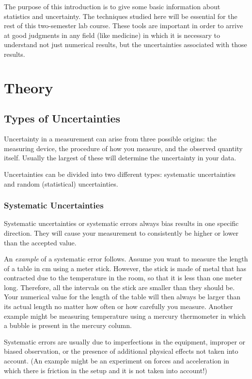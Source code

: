 The purpose of this introduction is to give some basic information about statistics and uncertainty. The techniques studied here will be essential for the rest of this two-semester lab course. These tools are important in order to arrive at good judgments in any field (like medicine) in which it is necessary to understand not just numerical results, but the uncertainties associated with those results.

\section{Theory}

\subsection{Types of Uncertainties}

Uncertainty in a measurement can arise from three possible origins: the measuring device, the procedure of how you measure, and the observed quantity itself. Usually the largest of these will determine the uncertainty in your data. \myskip

Uncertainties can be divided into two different types: systematic uncertainties and random (statistical) uncertainties.

\subsubsection{Systematic Uncertainties}

Systematic uncertainties or systematic errors always bias results in one specific direction. They will cause your measurement to consistently be higher or lower than the accepted value. \myskip

An \emph{example} of a systematic error follows. Assume you want to measure the length of a table in cm using a meter stick. However, the stick is made of metal that has contracted due to the temperature in the room, so that it is less than one meter long. Therefore, all the intervals on the stick are smaller than they should be. Your numerical value for the length of the table will then always be larger than its actual length no matter how often or how carefully you measure. Another example might be measuring temperature using a mercury thermometer in which a bubble is present in the mercury column. \myskip

Systematic errors are usually due to imperfections in the equipment, improper or biased observation, or the presence of additional physical effects not taken into account. (An example might be an experiment on forces and acceleration in which there is friction in the setup and it is not taken into account!) \myskip

